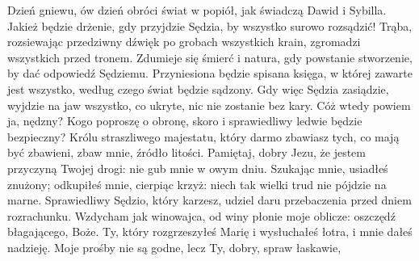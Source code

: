 \begin{tekst}
  {Dzień gniewu, ów dzień obróci świat w popiół, jak świadczą Dawid i Sybilla.}
  {Jakież będzie drżenie, gdy przyjdzie Sędzia, by wszystko surowo rozsądzić!}
  {Trąba, rozsiewając przedziwny dźwięk po grobach wszystkich krain,
   zgromadzi wszystkich przed tronem.}
  {Zdumieje się śmierć i natura, gdy powstanie stworzenie,
   by dać odpowiedź Sędziemu.}
  {Przyniesiona będzie spisana księga, w której zawarte jest wszystko,
   według czego świat będzie sądzony.}
  {Gdy więc Sędzia zasiądzie, wyjdzie na jaw wszystko, co ukryte,
   nic nie zostanie bez kary.}
  {Cóż wtedy powiem ja, nędzny? Kogo poproszę o obronę,
   skoro i sprawiedliwy ledwie będzie bezpieczny?}
  {Królu straszliwego majestatu, który darmo zbawiasz tych, co mają być zbawieni,
   zbaw mnie, źródło litości.}
  {Pamiętaj, dobry Jezu, że jestem przyczyną Twojej drogi:
   nie gub mnie w owym dniu.}
  {Szukając mnie, usiadłeś znużony; odkupiłeś mnie, cierpiąc krzyż:
   niech tak wielki trud nie pójdzie na marne.}
  {Sprawiedliwy Sędzio, który karzesz, udziel daru przebaczenia
   przed dniem rozrachunku.}
  {Wzdycham jak winowajca, od winy płonie moje oblicze:
   oszczędź błagającego, Boże.}
  {Ty, który rozgrzeszyłeś Marię i wysłuchałeś łotra,
   i mnie dałeś nadzieję.}
  {Moje prośby nie są godne, lecz Ty, dobry, spraw łaskawie,
}
\end{tekst}
